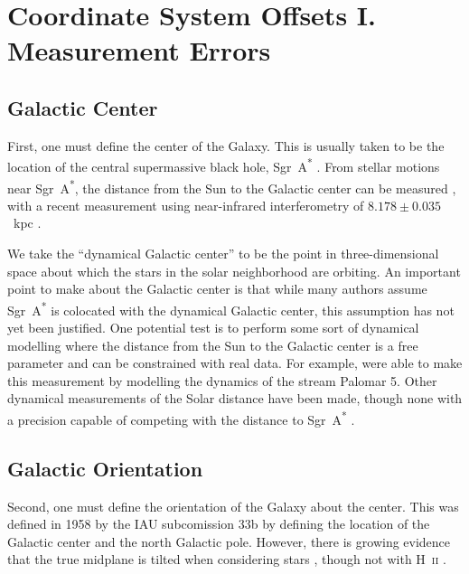 \documentclass[twocolumn]{aastex62}
\begin{document}
\section{Coordinate System Offsets I. Measurement Errors} \label{sec:mes_err}

\subsection{Galactic Center}
First, one must define the center of the Galaxy. This is usually taken to be
the location of the central supermassive black hole, Sgr~A\textsuperscript{*}
\citep[e.g.][]{2004ApJ...616..872R}. From stellar motions near
Sgr~A\textsuperscript{*}, the distance from the Sun to the Galactic center can
be measured \citep{2009ApJ...692.1075G, 2018AA...615L..15G}, with a recent
measurement using near-infrared interferometry of $8.178 \pm 0.035$~kpc
\citep{2019arXiv190405721A}.

We take the ``dynamical Galactic center'' to be the point in three-dimensional
space about which the stars in the solar neighborhood are orbiting. An
important point to make about the Galactic center is that while many authors
assume Sgr~A\textsuperscript{*} is colocated with the dynamical Galactic
center, this assumption has not yet been justified. One potential test is to
perform some sort of dynamical modelling where the distance from the Sun to
the Galactic center is a free parameter and can be constrained with real data.
For example, \citet{2015ApJ...803...80K} were able to make this measurement by
modelling the dynamics of the stream Palomar 5. Other dynamical measurements
of the Solar distance have been made, though none with a precision capable of
competing with the distance to Sgr~A\textsuperscript{*}
\citep{1981gask.book.....M, 2011PASJ...63..867S, 2012MNRAS.427..274S,
2013AstL...39...95B, 2013IAUS..289..444Z}.

\subsection{Galactic Orientation}
Second, one must define the orientation of the Galaxy about the center. This
was defined in 1958 by the IAU subcomission 33b \citep{1960MNRAS.121..123B} by
defining the location of the Galactic center and the north Galactic pole.
However, there is growing evidence that the true midplane is tilted when
considering stars \citep{2014ApJ...797...53G, 2016ARAA..54..529B}, though not
with H~\textsc{ii} \citep{2019ApJ...871..145A}.
\end{document}
